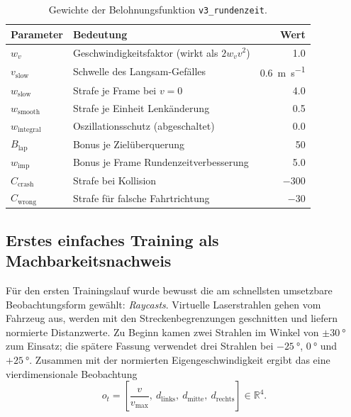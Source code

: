 \begin{table}[htbp]
  \centering
  \caption{Gewichte der Belohnungsfunktion \texttt{v3\_rundenzeit}.}
  \label{tab:reward_gewichte}
  \begin{tabular}{@{}l l r@{}}
    \toprule
    \textbf{Parameter} & \textbf{Bedeutung} & \textbf{Wert} \\
    \midrule
    $w_v$                  & Geschwindigkeitsfaktor (wirkt als $2 w_v v^2$)      & \num{1.0}    \\
    $v_{\text{slow}}$      & Schwelle des Langsam-Gefälles            & \SI{0.6}{\meter\per\second} \\
    $w_{\text{slow}}$      & Strafe je Frame bei $v = 0$              & \num{4.0}    \\
    $w_{\text{smooth}}$    & Strafe je Einheit Lenkänderung           & \num{0.5}    \\
    $w_{\text{integral}}$  & Oszillationsschutz (abgeschaltet)        & \num{0.0}    \\
    $B_{\text{lap}}$       & Bonus je Zielüberquerung                 & \num{+50}    \\
    $w_{\text{imp}}$       & Bonus je Frame Rundenzeitverbesserung    & \num{5.0}    \\
    $C_{\text{crash}}$     & Strafe bei Kollision                     & \num{-300}   \\
    $C_{\text{wrong}}$     & Strafe für falsche Fahrtrichtung         & \num{-30}    \\
    \bottomrule
  \end{tabular}
\end{table}

\subsection{Erstes einfaches Training als Machbarkeitsnachweis}
\label{subsubsec:erstes_training}

Für den ersten Trainingslauf wurde bewusst die am schnellsten umsetzbare Beobachtungsform gewählt: \emph{Raycasts}. Virtuelle Laserstrahlen gehen vom Fahrzeug aus, werden mit den Streckenbegrenzungen geschnitten und liefern normierte Distanzwerte. Zu Beginn kamen zwei Strahlen im Winkel von $\pm\SI{30}{\degree}$ zum Einsatz; die spätere Fassung verwendet drei Strahlen bei $-\SI{25}{\degree}$, $\SI{0}{\degree}$ und $+\SI{25}{\degree}$. Zusammen mit der normierten Eigengeschwindigkeit ergibt das eine vierdimensionale Beobachtung
\begin{equation}
  o_t = \left[ \frac{v}{v_{\max}},\ d_{\text{links}},\ d_{\text{mitte}},\ d_{\text{rechts}} \right] \in \mathbb{R}^4 .
  \label{eq:lidar_obs}
\end{equation}

